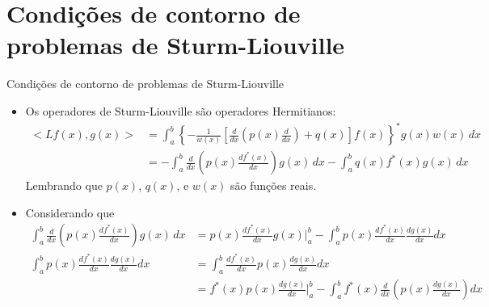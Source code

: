   \section[ slide = true ]{Condições de contorno de problemas de Sturm-Liouville}
      \begin{slide}[toc=]{Condições de contorno de problemas de Sturm-Liouville}
		\begin{itemize}
			\item Os operadores de Sturm-Liouville são operadores Hermitianos:
				\begin{align*}
					<Lf(x),g(x)> &= \int_a^b\left \{ -\frac{1}{w(x)}\left [ \frac{d}{dx}\left ( p(x)\frac{d}{dx} \right ) + q(x) \right ]f(x)\right \}^\ast g(x) w(x)\,dx\\
					&= -\int_a^b \frac{d}{dx}\left ( p(x)\frac{df^\ast(x)}{dx} \right ) g(x)\,dx -\int_a^b q(x) f^\ast(x)g(x)\,dx
				\end{align*}
				Lembrando que $p(x)$, $q(x)$, e $w(x)$ são funções reais.
			\item Considerando que
				\begin{align*}
					\int_a^b \frac{d}{dx}\left ( p(x)\frac{df^\ast(x)}{dx} \right ) g(x)\,dx &= p(x)\frac{df^\ast(x)}{dx}g(x)\Big \vert_a^b - \int_a^bp(x)\frac{df^\ast (x)}{dx}\frac{dg(x)}{dx} dx\\
					\int_a^bp(x)\frac{df^\ast (x)}{dx}\frac{dg(x)}{dx} dx &= \int_a^b\frac{df^\ast (x)}{dx}p(x)\frac{dg(x)}{dx} dx\\
					&=f^\ast (x)p(x)\frac{dg(x)}{dx}\Big \vert_a^b - \int_a^bf^\ast (x)\frac{d}{dx}\left (p(x)\frac{dg(x)}{dx}\right ) dx
				\end{align*}
		\end{itemize}
      \end{slide}

